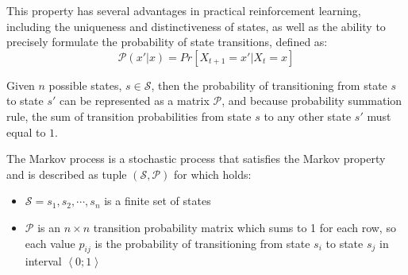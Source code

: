 \documentclass[../xlapes02]{subfiles}
\begin{document}
    This property has several advantages in practical reinforcement learning, including the uniqueness and distinctiveness of states, as well as the ability to precisely formulate the probability of state transitions, defined as:~\cite{FITMT25127}
    \begin{equation}
        \mathcal{P}(x'|x)=Pr\left[X_{t+1}=x'|X_t=x\right]
    \end{equation}

    Given $n$ possible states, $s\in \mathcal{S}$, then the probability of transitioning from state $s$ to state $s'$ can be represented as a matrix $\mathcal{P}$, and because probability summation rule, the sum of transition probabilities from state $s$ to any other state $s'$ must equal to $1$.

    \begin{definition}
        The Markov process is a stochastic process that satisfies the Markov property and is described as tuple $\left(\mathcal{S}, \mathcal{P}\right)$ for which holds:\cite{ABATE2021102207}
        \begin{itemize}
            \item $\mathcal{S}=s_1,s_2,\cdots,s_n$ is a finite set of states
            \item $\mathcal{P}$ is an $n\times n$ transition probability matrix which sums to 1 for each row, so each value $p_{ij}$ is the probability of transitioning from state $s_i$ to state $s_j$ in interval $\left< 0;1 \right>$
        \end{itemize}
    \end{definition}

\end{document}
